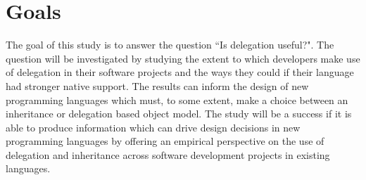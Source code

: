 \section{Goals}
The goal of this study is to answer the question ``Is delegation useful?". The question will be investigated by studying the extent to which developers make use of delegation in their software projects and the ways they could if their language had stronger native support. The results can inform the design of new programming languages which must, to some extent, make a choice between an inheritance or delegation based object model. The study will be a success if it is able to produce information which can drive design decisions in new programming languages by offering an empirical perspective on the use of delegation and inheritance across software development projects in existing languages.